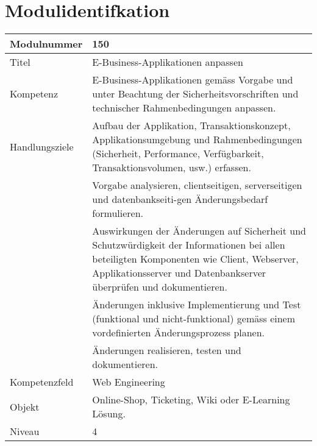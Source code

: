 \mode*

\setmonofont{Verdana}

\section{Modulidentifkation}



\begin{center}
    \begin{tabular}[h]{|p{4cm}|p{12.5cm}|}
        \hline
        Modulnummer & 150 \\ \hline
        Titel & E-Business-Applikationen anpassen \\ \hline
        Kompetenz & E-Business-Applikationen gemäss Vorgabe und unter Beachtung der
        Sicherheitsvorschriften und technischer Rahmenbedingungen anpassen. \\ \hline
        \multirow{1}{*}{Handlungsziele} &
        Aufbau der Applikation, Transaktionskonzept, Applikationsumgebung
        und Rahmenbedingungen (Sicherheit, Performance, Verfügbarkeit, Transaktionsvolumen, usw.) erfassen. \\
        \cellcolor{white}  & Vorgabe analysieren, clientseitigen, serverseitigen und datenbankseiti-gen
        Änderungsbedarf formulieren. \\
        \cellcolor{white}  & Auswirkungen der Änderungen auf Sicherheit und Schutzwürdigkeit der
        Informationen bei allen beteiligten Komponenten wie Client, Webserver, Applikationsserver
        und Datenbankserver überprüfen und dokumentieren. \\
        \cellcolor{white}  & Änderungen inklusive Implementierung und Test (funktional und nicht-funktional)
        gemäss einem vordefinierten Änderungsprozess planen. \\
        \cellcolor{white}  & Änderungen realisieren, testen und dokumentieren. \\ \hline
        Kompetenzfeld & Web Engineering \\ \hline
        Objekt & Online-Shop, Ticketing, Wiki oder E-Learning Lösung. \\ \hline
        Niveau & 4 \\ \hline
    \end{tabular}
\end{center}

